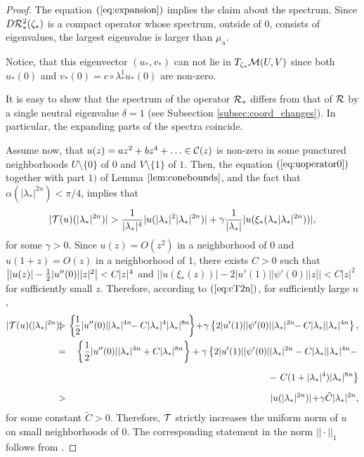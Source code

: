 \begin{proof}
{The equation $(\ref{eq:expansion})$ implies the claim about the spectrum. Since $D \mathcal{R}_*^2(\zeta_*)$ is a compact operator whose spectrum, outside of $0$, consists of eigenvalues, the largest eigenvalue is larger than $\mu_u$. 

Notice, that this eigenvector $(u_*,v_*)$ can  not lie in $T_{\zeta_*}\mathcal{M}(U,V)$ since both $u_*(0)$ and $v_*(0)=c \circ \lambda^{1}_* u_*(0)$ are non-zero.

It is easy to show that the spectrum of the operator $\mathcal{R}_*$ differs from that of $\mathcal{R}$ by a single neutral eigenvalue $\delta=1$ (see Subsection \ref{subsec:coord_changes}). In particular, the expanding parts of the spectra coincide.

}

\medskip

  Assume now, that $u(z)=a z^2+b z^4 + \ldots \in \mathcal{C}(z)$ is non-zero in some punctured neighborhoods $U \setminus \{ 0\}$ of $0$ and  $V \setminus \{1\}$ of $1$. Then, the equation $(\ref{eq:uoperator0})$ together with part $1)$  of Lemma $\ref{lem:conebounds}$, and the fact that $\alpha(|\lambda_*|^{2 n})<\pi/4$,  implies that 
\begin{equation}
\label{eq:cT2n} |\mathcal{T}(u)(|\lambda_*|^{2 n})| > {1 \over |\lambda_*|^4} |u( |\lambda_*|^2 |\lambda_*|^{2n})| + \gamma {1 \over |\lambda_*|}  |u(\xi_*(\lambda_* |\lambda_*|^{2 n}))|,
\end{equation}
for some $\gamma>0$. Since $u(z)=O(z^2)$ in a neighborhood of $0$ and $u(1+z)=O(z)$ in a neighborhood of $1$, there exists $C>0$ such that $\left||u(z)|-{1 \over 2} |u''(0)||z|^2 \right|<C |z|^4$ and $\left| |u(\xi_*(z))|-2|u'(1)||\psi'(0)||z| \right|<C |z|^2$ for sufficiently small $z$. Therefore, according to $(\ref{eq:cT2n})$, for sufficiently large $n$,
\begin{eqnarray}
\nonumber |\cT(u)(|\lambda_*|^{2 n})| \!\! & \!\!> \!\!&  \!\! \left\{ \! {1 \over 2} |u''(0)||\lambda_*|^{4 n} \! \!-C |\lambda_*|^4 |\lambda_*|^{8 n} \! \right\}\!+\! \gamma \left\{ 2|u'(1)||\psi'(0)||\lambda_*|^{2 n} \!\!-C |\lambda_*||\lambda_*|^{4 n}   \right\}, \\
\nonumber  \!\!& \!\!= \!\!&  \!\!\left\{ {1 \over 2} |u''(0)||\lambda_*|^{4 n} +C |\lambda_*|^{8 n}  \right\}+ \gamma \left\{ 2|u'(1)||\psi'(0)||\lambda_*|^{2 n} -C |\lambda_*||\lambda_*|^{4 n} - \right. \\
\nonumber  \!\!& \!\!\phantom{=} \!\!&  \!\!\phantom{\left\{ {1 \over 2} |u''(0)||\lambda_*|^{4 n} +C |\lambda_*|^{8 n}  \right\}}- \left. C(1+|\lambda_*|^4)  |\lambda_*|^{8 n} \right\} \\
\nonumber  \!\!& \!\!> \!\!& \!\! |u(|\lambda_*|^{2 n})|\!+\! \gamma \tilde{C} |\lambda_*|^{2 n},
\end{eqnarray}
for some constant $\tilde{C}>0$. Therefore, $\mathcal{T}$ strictly increases the uniform norm of $u$ on small neighborhoods of $0$.  The corresponding statement in the norm $||\cdot ||_1$ follows from .



\end{proof}
